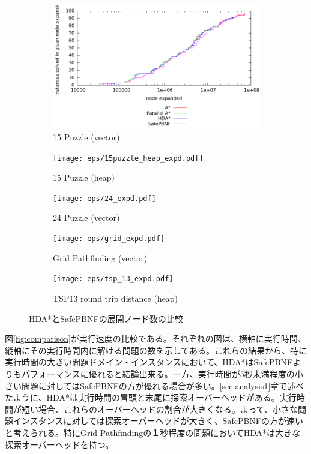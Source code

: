 \documentclass[uplatex]{jsarticle}
\begin{document}
\begin{figure}
	\centering
	\begin{subfigure}{0.4\columnwidth}
		\includegraphics[width=\columnwidth]{eps/15puzzle_vector_expd.pdf}
		\caption{15 Puzzle (vector)}
		\label{fig:15puzzle_vector_expd}
	\end{subfigure}
	\begin{subfigure}{0.4\columnwidth}
		\texttt{[image: eps/15puzzle\_heap\_expd.pdf]}
		\caption{15 Puzzle (heap)}
		\label{fig:15puzzle_heap_expd}
	\end{subfigure}
	\begin{subfigure}{0.4\columnwidth}
		\texttt{[image: eps/24\_expd.pdf]}
		\caption{24 Puzzle (vector)}
		\label{fig:24puzzle_vector_expd}
	\end{subfigure}
	\begin{subfigure}{0.4\columnwidth}
		\texttt{[image: eps/grid\_expd.pdf]}
		\caption{Grid Pathfinding (vector)}
		\label{fig:grid_expd}
	\end{subfigure}
	\begin{subfigure}{0.4\columnwidth}
		\texttt{[image: eps/tsp\_13\_expd.pdf]}
		\caption{TSP13 round trip distance (heap)}
		\label{fig:tsp_13_expd}
	\end{subfigure}
	\caption{HDA*とSafePBNFの展開ノード数の比較}
	\label{fig:comparison_expd}
\end{figure}%


図\ref{fig:comparison}が実行速度の比較である。それぞれの図は、横軸に実行時間、縦軸にその実行時間内に解ける問題の数を示してある。これらの結果から、特に実行時間の大きい問題ドメイン・インスタンスにおいて、HDA*はSafePBNFよりもパフォーマンスに優れると結論出来る。一方、実行時間が5秒未満程度の小さい問題に対してはSafePBNFの方が優れる場合が多い。\ref{sec:analysis1}章で述べたように、HDA*は実行時間の冒頭と末尾に探索オーバーヘッドがある。実行時間が短い場合、これらのオーバーヘッドの割合が大きくなる。よって、小さな問題インスタンスに対しては探索オーバーヘッドが大きく、SafePBNFの方が速いと考えられる。特にGrid Pathfindingの１秒程度の問題においてHDA*は大きな探索オーバーヘッドを持つ。
\newline
\end{document}
